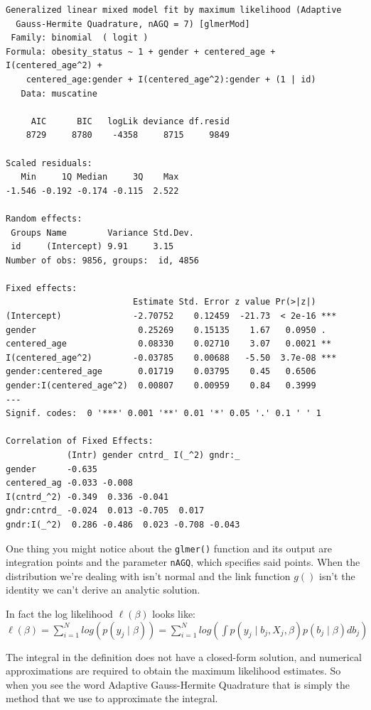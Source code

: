 \documentclass[
  letterpaper,
  DIV=11,
  numbers=noendperiod]{scrreprt}
\begin{document}
\begin{verbatim}
Generalized linear mixed model fit by maximum likelihood (Adaptive
  Gauss-Hermite Quadrature, nAGQ = 7) [glmerMod]
 Family: binomial  ( logit )
Formula: obesity_status ~ 1 + gender + centered_age + I(centered_age^2) +  
    centered_age:gender + I(centered_age^2):gender + (1 | id)
   Data: muscatine

     AIC      BIC   logLik deviance df.resid 
    8729     8780    -4358     8715     9849 

Scaled residuals: 
   Min     1Q Median     3Q    Max 
-1.546 -0.192 -0.174 -0.115  2.522 

Random effects:
 Groups Name        Variance Std.Dev.
 id     (Intercept) 9.91     3.15    
Number of obs: 9856, groups:  id, 4856

Fixed effects:
                         Estimate Std. Error z value Pr(>|z|)    
(Intercept)              -2.70752    0.12459  -21.73  < 2e-16 ***
gender                    0.25269    0.15135    1.67   0.0950 .  
centered_age              0.08330    0.02710    3.07   0.0021 ** 
I(centered_age^2)        -0.03785    0.00688   -5.50  3.7e-08 ***
gender:centered_age       0.01719    0.03795    0.45   0.6506    
gender:I(centered_age^2)  0.00807    0.00959    0.84   0.3999    
---
Signif. codes:  0 '***' 0.001 '**' 0.01 '*' 0.05 '.' 0.1 ' ' 1

Correlation of Fixed Effects:
            (Intr) gender cntrd_ I(_^2) gndr:_
gender      -0.635                            
centered_ag -0.033 -0.008                     
I(cntrd_^2) -0.349  0.336 -0.041              
gndr:cntrd_ -0.024  0.013 -0.705  0.017       
gndr:I(_^2)  0.286 -0.486  0.023 -0.708 -0.043
\end{verbatim}

One thing you might notice about the \texttt{glmer()} function and its
output are integration points and the parameter \texttt{nAGQ}, which
specifies said points. When the distribution we're dealing with isn't
normal and the link function \(g()\) isn't the identity we can't derive
an analytic solution.

In fact the log likelihood \(\ell(\beta)\) looks like:
\(\ell(\beta) = \sum^N_{i=1}log( p(y_j \mid \beta) ) = \sum^N_{i=1}log( \int p(y_j \mid b_j,X_j, \beta)p(b_j \mid \beta) db_j)\)

The integral in the definition does not have a closed-form solution, and
numerical approximations are required to obtain the maximum likelihood
estimates. So when you see the word Adaptive Gauss-Hermite Quadrature
that is simply the method that we use to approximate the integral.
\end{document}
